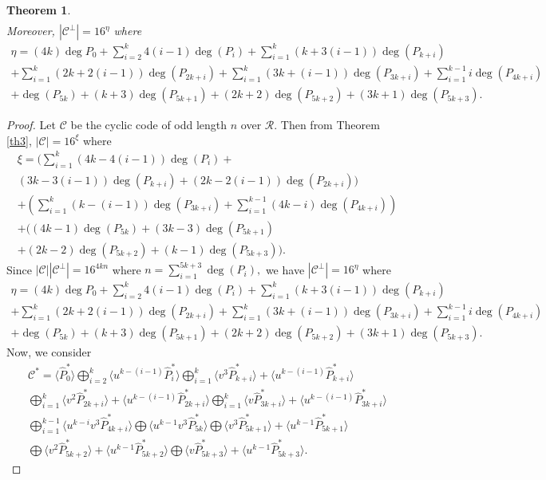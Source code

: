 \documentclass{amsart}
\newtheorem{theorem}{Theorem}[section]
\theoremstyle{definition}
\theoremstyle{remark}
\numberwithin{equation}{section}
\begin{document}
\begin{theorem}
\begin{gather*}
\end{gather*}
Moreover, $|\mathcal{C}^\perp|=16^{\eta}$ where
\begin{gather*}
  \eta = (4k)\deg {P}_0 +\sum_{i=2}^{k} 4(i-1)\deg (P_i) +\sum_{i=1}^{k} (k+3(i-1)) \deg (P_{k+i}) \\+\sum_{i=1}^{k} (2k+2(i-1)) \deg (P_{2k+i})  +\sum_{i=1}^{k} (3k+(i-1)) \deg (P_{3k+i})+\sum_{i=1}^{k-1} i \deg (P_{4k+i}) \\+ \deg (P_{5k}) + (k+3)\deg (P_{5k+1})  + (2k+2) \deg (P_{5k+2}) + (3k+1)\deg (P_{5k+3}).
\end{gather*}
\end{theorem}
\begin{proof}
    Let $\mathcal{C}$ be the cyclic code of odd length $n$ over $\mathcal{R}$. Then from Theorem \ref{th3},
    $|\mathcal{C}|=16^{\xi}$ where
\begin{gather*}
  \xi = ( \sum_{i=1}^{k} (4k-4(i-1))\deg(P_i) + \\ (3k-3(i-1))\deg(P_{k+i}) + (2k-2(i-1))\deg(P_{2k+i}) ) \\
    + \left( \sum_{i=1}^{k} (k-(i-1))\deg(P_{3k+i})
    + \sum_{i=1}^{k-1}(4k-i)\deg(P_{4k+i}) \right)\\
    + ((4k-1)\deg(P_{5k}) + (3k-3)\deg(P_{5k+1}) \\+ (2k-2)\deg(P_{5k+2}) + (k-1)\deg(P_{5k+3}) ).
\end{gather*}
Since $|\mathcal{C}||\mathcal{C}^\perp| = 16^{4kn}$ where $n= \sum_{i=1}^{5k+3} \deg(P_i), $ we have $ |\mathcal{C}^\perp| = 16^\eta $ where \begin{gather*}
    \eta = (4k)\deg {P}_0 +\sum_{i=2}^{k} 4(i-1)\deg (P_i) +\sum_{i=1}^{k} (k+3(i-1)) \deg (P_{k+i}) \\+\sum_{i=1}^{k} (2k+2(i-1)) \deg (P_{2k+i})  +\sum_{i=1}^{k} (3k+(i-1)) \deg (P_{3k+i})+\sum_{i=1}^{k-1} i \deg (P_{4k+i}) \\+ \deg (P_{5k}) + (k+3)\deg (P_{5k+1})  + (2k+2) \deg (P_{5k+2}) + (3k+1)\deg (P_{5k+3}).
\end{gather*}
Now, we consider \begin{gather*}
    \mathcal{C}^* = \langle\hat{P}_{0}^*\rangle \bigoplus_{i=2}^{k}\langle u^{k-(i-1)}\hat{P}_{i}^*\rangle \bigoplus_{i=1}^{k} \langle v^3 \hat{P}_{k+i}^* \rangle + \langle u^{k-(i-1)} \hat{P}_{k+i}^* \rangle \\\bigoplus_{i=1}^{k} \langle v^2 \hat{P}_{2k+i}^* \rangle + \langle u^{k-(i-1)} \hat{P}_{2k+i}^* \rangle \bigoplus_{i=1}^{k} \langle v \hat{P}_{3k+i}^* \rangle + \langle u^{k-(i-1)} \hat{P}_{3k+i}^* \rangle \\\bigoplus_{i=1}^{k-1} \langle u^{k-i}v^3 \hat{P}_{4k+i}^* \rangle  \bigoplus \langle u^{k-1}v^3 \hat{P}_{5k}^* \rangle \bigoplus \langle v^3 \hat{P}_{5k+1}^* \rangle + \langle u^{k-1} \hat{P}_{5k+1}^* \rangle \\   \bigoplus \langle v^2 \hat{P}_{5k+2}^* \rangle + \langle u^{k-1} \hat{P}_{5k+2}^* \rangle \bigoplus \langle v \hat{P}_{5k+3}^* \rangle + \langle u^{k-1} \hat{P}_{5k+3}^* \rangle. 

\end{gather*}
\end{proof}
\end{document}
